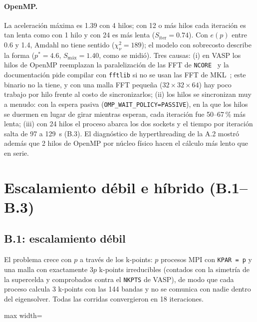 \documentclass[11pt,a4paper]{article}
\newcommand{\cod}[1]{\texttt{#1}}
\begin{document}
\paragraph{OpenMP.} La aceleración máxima es 1.39 con 4 hilos; con 12 o más hilos cada iteración es tan lenta
como con 1 hilo y con 24 es más lenta ($S_\text{iter}=0.74$). Con $e(p)$ entre 0.6 y 1.4, Amdahl no tiene
sentido ($\chi^2_\nu=189$); el modelo con sobrecosto describe la forma ($p^{*}=4.6$, $S_\text{máx}=1.40$,
como se midió). Tres causas: (i) en VASP los hilos de OpenMP reemplazan la paralelización de las FFT de
\cod{NCORE}~\cite{vasp-par} y la documentación pide compilar con \cod{fftlib} si no se usan las FFT de
MKL~\cite{vasp-omp}; este binario no la tiene, y con una malla FFT pequeña ($32\times32\times64$) hay poco
trabajo por hilo frente al costo de sincronizarlos; (ii) los hilos se sincronizan muy a menudo: con la espera pasiva
(\cod{OMP\_WAIT\_POLICY=PASSIVE}), en la que los hilos se duermen en lugar de girar mientras esperan, cada
iteración fue 50--67\,\% más lenta; (iii) con 24 hilos el proceso abarca los dos
sockets y el tiempo por iteración salta de 97 a 129~s (B.3). El diagnóstico de hyperthreading de la A.2
mostró además que 2 hilos de OpenMP por núcleo físico hacen el cálculo más lento que en serie.

\section{Escalamiento débil e híbrido (B.1--B.3)}

\subsection{B.1: escalamiento débil}\label{sec:b1}
El problema crece con $p$ a través de los k-points: $p$ procesos MPI con \cod{KPAR = p} y una malla con
exactamente $3p$ k-points irreducibles (contados con la simetría de la supercelda y comprobados contra el
\cod{NKPTS} de VASP), de modo que cada proceso calcula 3 k-points con las 144 bandas y no se comunica con nadie
dentro del eigensolver. Todas las corridas convergieron en 18 iteraciones.

\begin{table}[H]
\centering\small
\begin{adjustbox}{max width=\textwidth}\end{adjustbox}
\caption{Escalamiento débil: $E_w(p)=t(1)/t(p)$; s/iter.: tiempo medio por iteración SCF; EDDAV: el
eigensolver de Davidson (95\,\% de cada iteración). Memoria: VmHWM, máximo por proceso y suma de todos.}
\label{tab:B1}
\end{table}
\end{document}
